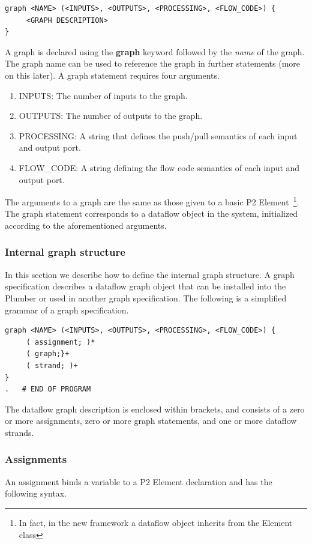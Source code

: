 \documentclass{article}
\begin{document}
\begin{verbatim}
graph <NAME> (<INPUTS>, <OUTPUTS>, <PROCESSING>, <FLOW_CODE>) {
     <GRAPH DESCRIPTION>
}
\end{verbatim}

A graph is declared using the {\bf graph} keyword followed by the {\em name}
of the graph. The graph name can be used to reference the graph in further
statements (more on this later). A graph statement requires four arguments.
\begin{enumerate}
\item INPUTS: The number of inputs to the graph.
\item OUTPUTS: The number of outputs to the graph.
\item PROCESSING: A string that defines the push/pull semantics of each input and output port.
\item FLOW\_CODE: A string defining the flow code semantics of each input and output port.
\end{enumerate}
The arguments to a graph are the same as those given to a basic P2 
Element~\footnote{In fact, in the new framework a dataflow object inherits 
from the Element class}. The graph statement corresponds to a dataflow 
object in the system, initialized according to the aforementioned arguments.

\subsubsection{Internal graph structure}

In this section we describe how to define the internal graph structure.
A graph specification describes a dataflow graph object that can be installed 
into the Plumber or used in another graph specification. The following is a 
simplified grammar of a graph specification.

\begin{verbatim}
graph <NAME> (<INPUTS>, <OUTPUTS>, <PROCESSING>, <FLOW_CODE>) {
     ( assignment; )*
     ( graph;}+
     ( strand; )+
}
.	# END OF PROGRAM
\end{verbatim}

The dataflow graph description is enclosed within brackets, and consists of a zero or more assignments, zero or more graph statements, and one or more dataflow strands.

\subsubsection{Assignments}
An assignment binds a variable to a P2 Element declaration and has the following 
syntax.
\end{document}
